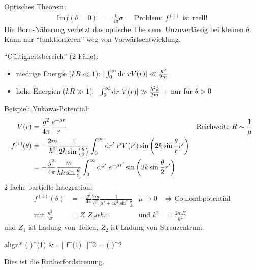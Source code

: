 	Optisches Theorem:
		\begin{align*}
			\mathrm{Im} f(\theta = 0) &= \frac{k}{4 \pi} \sigma
			& &\text{Problem: } f^{(1)} \text{ ist reell!}
		\end{align*}
	Die Born-Näherung verletzt das optische Theorem.
	Unzuverlässig bei kleinen $\theta$. Kann nur ``funktionieren'' weg von Vorwärtsentwicklung.
	
	``Gültigkeitsbereich'' (2 Fälle):
		\begin{itemize}
			\item niedrige Energie ($kR \ll 1$):
			$| \int_0^\infty \mathrm{d} r ~r V(r)|
			\ll \frac{\hbar^2}{2m}$
			\item hohe Energien ($kR \gg 1$):
			$ | \int_0^\infty \mathrm{d} r ~V(r)| 
			\gg \frac{\hbar^2 k}{2m}$ 
			+ nur für $\theta > 0$
		\end{itemize}
	Beispiel: Yukawa-Potential: 
		\begin{align*}
			V(r) &= \frac{g^2}{4 \pi} \frac{e^{-\mu r}}{r}
			& &\text{Reichweite } R \sim \frac{1}{\mu} \\
			f^{(1)} (\theta) 
			&= - \frac{2m}{\hbar^2} \frac{1}{2 k \sin \left(\frac{\theta}{2}\right)} 
			\int_0^\infty \mathrm{d} r' ~r' V(r')
			\sin \left(2 k \sin \frac{\theta}{r} r'\right) \\
			&= - \frac{g^2}{4 \pi} \frac{m}{\hbar k \sin \frac{\theta}{2}}
			\int_0^\infty \mathrm{d} r' ~e^{-\mu r'} 
			\sin \left(2 k \sin \frac{\theta}{2} r' \right)
		\end{align*}
	2 fache partielle Integration:
		\begin{align*}
			f^{(1)}(\theta) 
			&= - \frac{g^2}{4 \pi} \frac{2m}{\hbar^2}
			\frac{1}{\mu^2 +  4 k^2 \sin^2 \frac{\theta}{2}}
			& \mu \rightarrow 0 
			&\Rightarrow \text{ Coulombpotential} \\
			\text{mit } \frac{g^2}{4 \pi} 
			&= Z_1 Z_2 \alpha \hbar c 
			& \text{und } k^2 &= \frac{2mE}{\hbar^2}
		\end{align*}
	und $Z_1$ ist Ladung von Teilen, $Z_2$ ist Ladung von Streuzentrum.
		\begin{empheq}[box=\boxed]{align*}
			\left( \frac{\diff \sigma}{\diff \Omega} \right)^{(1)} 
			&= | f^{(1)}_{}|^2
			= \left(
			\right)^2
		\end{empheq}
	Dies ist die \underline{Rutherfordstreuung}.
	
